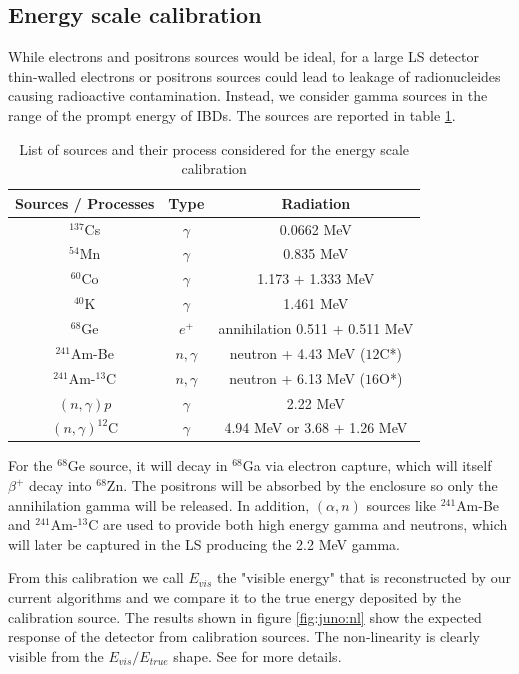 \documentclass[../main.tex]{subfiles}
\begin{document}
\subsection{Energy scale calibration}

While electrons and positrons sources would be ideal, for a large LS detector thin-walled electrons or positrons sources could lead to leakage of radionucleides causing radioactive contamination. Instead, we consider gamma sources in the range of the prompt energy of IBDs. The sources are reported in table \ref{tab:juno:calib_source}.

\begin{table}[ht]
  \centering
  \begin{tabular}{|c|c|c|}
    \hline
    Sources / Processes & Type & Radiation \\
    \hline
    $^{137}$Cs          & $\gamma$ & 0.0662 MeV \\
    $^{54}$Mn           & $\gamma$ & 0.835 MeV \\
    $^{60}$Co           & $\gamma$ & 1.173 + 1.333 MeV \\
    $^{40}$K            & $\gamma$ & 1.461 MeV \\
    $^{68}$Ge           & $e^{+}$  &  annihilation 0.511 + 0.511 MeV \\
    $^{241}$Am-Be       & $n,\gamma$ & neutron + 4.43 MeV (${12}$C*) \\
    $^{241}$Am-$^{13}$C & $n,\gamma$ & neutron + 6.13 MeV (${16}$O*) \\
    $(n, \gamma)p$      & $\gamma$ & 2.22 MeV \\
    $(n, \gamma)^{12}$C & $\gamma$ & 4.94 MeV or 3.68 + 1.26 MeV \\
    \hline
  \end{tabular}
  \caption{List of sources and their process considered for the energy scale calibration}
  \label{tab:juno:calib_source}
\end{table}

For the $^{68}$Ge source, it will decay in $^{68}$Ga via electron capture, which will itself $\beta^+$ decay into $^{68}$Zn. The positrons will be absorbed by the enclosure so only the annihilation gamma will be released. In addition, $(\alpha, n)$ sources like $^{241}$Am-Be and $^{241}$Am-$^{13}$C are used to provide both high energy gamma and neutrons, which will later be captured in the LS producing the 2.2 MeV gamma.

From this calibration we call $E_{vis}$ the "visible energy" that is reconstructed by our current algorithms and we compare it to the true energy deposited by the calibration source. The results shown in figure \ref{fig:juno:nl} show the expected response of the detector from calibration sources. The non-linearity is clearly visible from the $E_{vis} / E_{true}$ shape. See \cite{juno_collaboration_calibration_2021} for more details.
\end{document}
